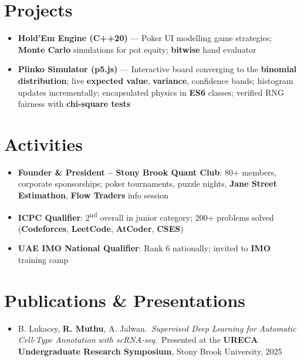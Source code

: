 \documentclass[letterpaper,10pt]{article}
\begin{document}
\begin{itemize}[leftmargin=*,itemsep=-2pt,topsep=1pt]
\end{itemize}

\section{Projects}
\begin{itemize}[leftmargin=*,itemsep=-2pt,topsep=1pt]

\item
\textbf{Hold’Em Engine (C++20)} — Poker UI modelling game strategies; \textbf{Monte Carlo} simulations for pot equity; \textbf{bitwise} hand evaluator

\item
\textbf{Plinko Simulator (p5.js)} — Interactive board converging to the \textbf{binomial distribution}; live \textbf{expected value}, \textbf{variance}, confidence bands; histogram updates incrementally; encapsulated physics in \textbf{ES6} classes; verified RNG fairness with \textbf{chi-square tests}
\end{itemize}

\section{Activities}
\begin{itemize}[leftmargin=*,itemsep=-2pt,topsep=1pt]
  \item \textbf{Founder \& President – Stony Brook Quant Club}: 80+ members, corporate sponsorships; poker tournaments, puzzle nights, \textbf{Jane Street Estimathon}, \textbf{Flow Traders} info session
  \item \textbf{ICPC Qualifier}: 2\textsuperscript{nd} overall in junior category; 200+ problems solved (\textbf{Codeforces}, \textbf{LeetCode}, \textbf{AtCoder}, \textbf{CSES})
  \item \textbf{UAE IMO National Qualifier}: Rank 6 nationally; invited to \textbf{IMO} training camp
\end{itemize}

\section{Publications \& Presentations}
\begin{itemize}[leftmargin=*,itemsep=-2pt,topsep=1pt]
  \item B. Lukacsy, \textbf{R. Muthu}, A. Jalwan.\,
        \textit{Supervised Deep Learning for Automatic Cell-Type Annotation with scRNA-seq}.\
        Presented at the \textbf{URECA Undergraduate Research Symposium}, Stony Brook University, 2025
\end{itemize}
\end{document}
